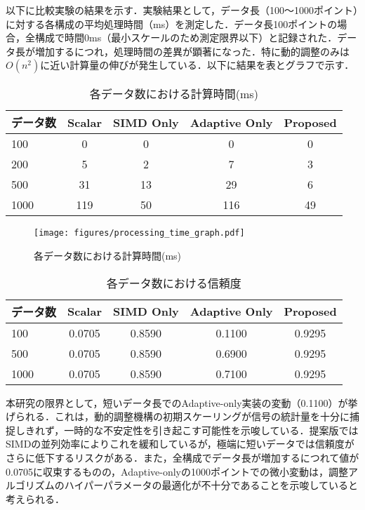 \documentclass[10pt,journal,compsoc]{IEEEtran}
\begin{document}
以下に比較実験の結果を示す．実験結果として，データ長（100〜1000ポイント）に対する各構成の平均処理時間（ms）を測定した．データ長100ポイントの場合，全構成で時間0ms（最小スケールのため測定限界以下）と記録された．データ長が増加するにつれ，処理時間の差異が顕著になった．特に動的調整のみは$O(n^2)$に近い計算量の伸びが発生している．以下に結果を表とグラフで示す．

\begin{table}[htbp]
\centering
\caption{各データ数における計算時間(ms)}
\label{tab:processing_time}
\begin{tabular}{lcccc}
\toprule
データ数 & Scalar & SIMD Only & Adaptive Only & Proposed \\
\midrule
100 & 0 & 0 & 0 & 0 \\
200 & 5 & 2 & 7 & 3 \\
500 & 31 & 13 & 29 & 6 \\
1000 & 119 & 50 & 116 & 49 \\
\bottomrule
\end{tabular}
\end{table}

\begin{figure}[htbp]
\centering
\texttt{[image: figures/processing\_time\_graph.pdf]}
\caption{各データ数における計算時間(ms)}
\label{fig:processing_time}
\end{figure}

\begin{table}[htbp]
\centering
\caption{各データ数における信頼度}
\label{tab:confidence}
\begin{tabular}{lcccc}
\toprule
データ数 & Scalar & SIMD Only & Adaptive Only & Proposed \\
\midrule
100 & 0.0705 & 0.8590 & 0.1100 & 0.9295 \\
500 & 0.0705 & 0.8590 & 0.6900 & 0.9295 \\
1000 & 0.0705 & 0.8590 & 0.7100 & 0.9295 \\
\bottomrule
\end{tabular}
\end{table}

本研究の限界として，短いデータ長でのAdaptive-only実装の変動（0.1100）が挙げられる．これは，動的調整機構の初期スケーリングが信号の統計量を十分に捕捉しきれず，一時的な不安定性を引き起こす可能性を示唆している．提案版ではSIMDの並列効率によりこれを緩和しているが，極端に短いデータでは信頼度がさらに低下するリスクがある．また，全構成でデータ長が増加するにつれて値が0.0705に収束するものの，Adaptive-onlyの1000ポイントでの微小変動は，調整アルゴリズムのハイパーパラメータの最適化が不十分であることを示唆していると考えられる．
\end{document}
